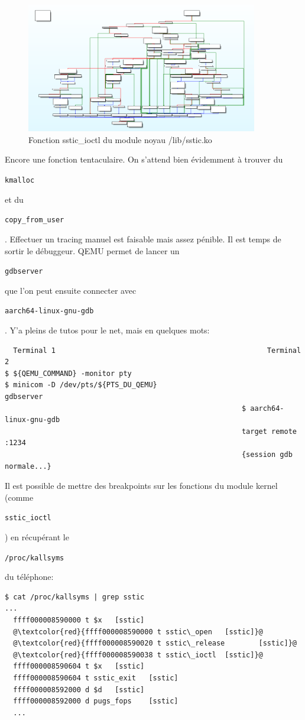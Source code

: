 \documentclass[14pt]{article}
\newcommand{\inlinebox}[2]{%
\colorbox{bg}{%
\parbox[b][0.6em]{\widthof{\texttt{#2}}}{\texttt{#2}}
}
}
\newcommand{\inlinebash}[1]{ \inlinebox{bash}{#1} }
\newcommand{\inlinec}[1]{ \inlinebox{c}{#1} }
\theoremstyle{definition}
\begin{document}
\begin{figure}[H]
\centering
\includegraphics[width=0.9\textwidth]{./screenshots/p3_kern_module_ioctl.png}
  \caption{Fonction sstic\_ioctl du module noyau /lib/sstic.ko}
  \label{fig:p3_kern_module_ioctl}
\end{figure}

Encore une fonction tentaculaire. On s'attend bien évidemment à trouver du \inlinec{kmalloc} et du \inlinec{copy_from_user}. Effectuer un tracing manuel est faisable mais assez pénible. Il est temps de sortir le débuggeur.
QEMU permet de lancer un \inlinebash{gdbserver} que l'on peut ensuite connecter avec \inlinebash{aarch64-linux-gnu-gdb}. Y'a pleins de tutos pour le net, mais en quelques mots:
\begin{verbatim}
  Terminal 1                                                  Terminal 2
$ ${QEMU_COMMAND} -monitor pty
$ minicom -D /dev/pts/${PTS_DU_QEMU}
gdbserver
                                                        $ aarch64-linux-gnu-gdb
                                                        target remote :1234
                                                        {session gdb normale...}
\end{verbatim}

Il est possible de mettre des breakpoints sur les fonctions du module kernel (comme \inlinec{sstic_ioctl}) en récupérant le \inlinebash{/proc/kallsyms} du téléphone:

\begin{tcolorbox}
\begin{lstlisting}[escapechar=@]
$ cat /proc/kallsyms | grep sstic
...
  ffff000008590000 t $x   [sstic]
  @\textcolor{red}{ffff000008590000 t sstic\_open   [sstic]}@
  @\textcolor{red}{ffff000008590020 t sstic\_release        [sstic]}@
  @\textcolor{red}{ffff000008590038 t sstic\_ioctl  [sstic]}@
  ffff000008590604 t $x   [sstic]
  ffff000008590604 t sstic_exit   [sstic]
  ffff000008592000 d $d   [sstic]
  ffff000008592000 d pugs_fops    [sstic]
  ...
\end{lstlisting}
\end{tcolorbox}
\end{document}
